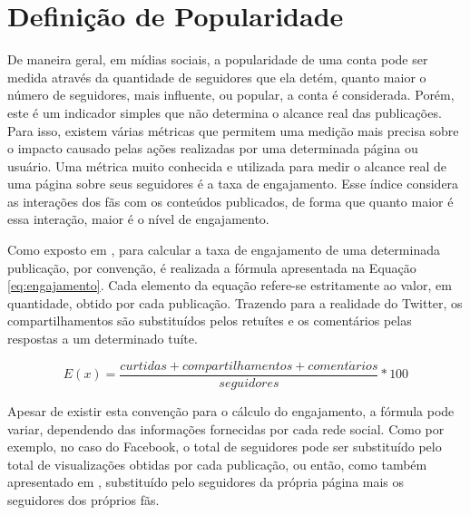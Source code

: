 \documentclass[oneside,openright,12pt]{ufsm_2015} %
\begin{document}

\section{Definição de Popularidade}
\label{sec:def-popularidade}

    \par De maneira geral, em mídias sociais, a popularidade de uma conta pode ser medida através da quantidade de seguidores que ela detém, quanto maior o número de seguidores, mais influente, ou popular, a conta é considerada. Porém, este é um indicador simples que não determina o alcance real das publicações. Para isso, existem várias métricas que permitem uma medição mais precisa sobre o impacto causado pelas ações realizadas por uma determinada página ou usuário. Uma métrica muito conhecida e utilizada para medir o alcance real de uma página sobre seus seguidores é a taxa de engajamento. Esse índice considera as interações dos fãs com os conteúdos publicados, de forma que quanto maior é essa interação, maior é o nível de engajamento.

    \par Como exposto em \cite{artigo:pillat:17}, para calcular a taxa de engajamento de uma determinada publicação, por convenção, é realizada a fórmula apresentada na Equação \ref{eq:engajamento}. Cada elemento da equação refere-se estritamente ao valor, em quantidade, obtido por cada publicação. Trazendo para a realidade do Twitter, os compartilhamentos são substituídos pelos retuítes e os comentários pelas respostas a um determinado tuíte.
    
    \begin{equation} \label{eq:engajamento}
    E(x) = \frac{curtidas + compartilhamentos + coment\acute{a}rios}{seguidores}*100
    \end{equation}
    
    \par Apesar de existir esta convenção para o cálculo do engajamento, a fórmula pode variar, dependendo das informações fornecidas por cada rede social. Como por exemplo, no caso do Facebook, o total de seguidores pode ser substituído pelo total de visualizações obtidas por cada publicação, ou então, como também apresentado em \cite{artigo:pillat:17}, substituído pelo seguidores da própria página mais os seguidores dos próprios fãs.

\end{document}
